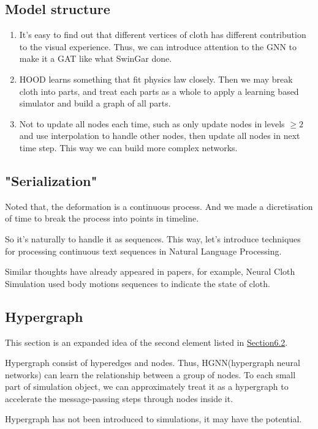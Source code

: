 \documentclass{article}
\begin{document}
\subsection{Model structure}
\begin{enumerate}
    \item It's easy to find out that different vertices of cloth has different contribution to the visual experience. Thus, we can introduce attention to the GNN to make it a GAT like what SwinGar\cite{li2023swingar} done.
    \item HOOD learns something that fit physics law closely. Then we may break cloth into parts, and treat each parts as a whole to apply a learning based simulator and build a graph of all parts.
    \item Not to update all nodes each time, such as only update nodes in levels $\ge 2$ and use interpolation to handle other nodes, then update all nodes in next time step. This way we can build more complex networks.
\end{enumerate}
\subsection{"Serialization"}
\par Noted that, the deformation is a continuous process. And we made a dicretisation of time to break the process into points in timeline.
\par So it's naturally to handle it as sequences. This way, let's introduce techniques for processing continuous text sequences in Natural Language Processing.
\par Similar thoughts have already appeared in papers, for example, Neural Cloth Simulation\cite{bertiche2022neural} used body motions sequences to indicate the state of cloth.
\subsection{Hypergraph}
\par This section is an expanded idea of the second element listed in \href{subsection.6.2}{Section6.2}.
\par Hypergraph consist of hyperedges and nodes. Thus, HGNN(hypergraph neural networks) can learn the relationship between a group of nodes. To each small part of simulation object, we can approximately treat it as a hypergraph to accelerate the message-passing steps through nodes inside it.
\par Hypergraph has not been introduced to simulations, it may have the potential.

\newpage


\end{document}
